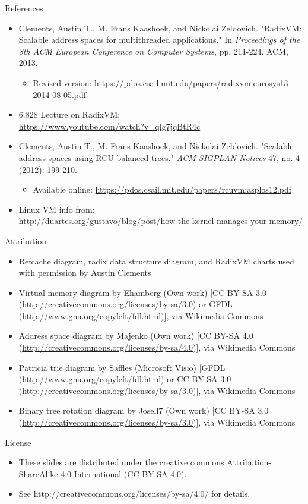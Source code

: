 \documentclass[aspectratio=169]{beamer}
\newcommand{\bi}{\begin{itemize}}
\newcommand{\ei}{\end{itemize}}
\begin{document}
\begin{frame}[noframenumbering]{References}
  \bi
\item Clements, Austin T., M. Frans Kaashoek, and Nickolai Zeldovich. "RadixVM: Scalable address spaces for multithreaded applications." In \emph{Proceedings of the 8th ACM European Conference on Computer Systems}, pp. 211-224. ACM, 2013.
  \bi
\item Revised version: \url{https://pdos.csail.mit.edu/papers/radixvm:eurosys13-2014-08-05.pdf}
  \ei
\item 6.828 Lecture on RadixVM:\\
  \url{https://www.youtube.com/watch?v=qlg7jqBtR4c}
\item Clements, Austin T., M. Frans Kaashoek, and Nickolai Zeldovich. "Scalable address spaces using RCU balanced trees." \emph{ACM SIGPLAN Notices} 47, no. 4 (2012): 199-210.
  \bi
\item Available online: \url{https://pdos.csail.mit.edu/papers/rcuvm:asplos12.pdf}
  \ei
\item Linux VM info from:\\ \url{http://duartes.org/gustavo/blog/post/how-the-kernel-manages-your-memory/}
  \ei
\end{frame}

\begin{frame}[noframenumbering]{Attribution}
  \bi
\item Refcache diagram, radix data structure diagram, and RadixVM charts used with permission by Austin Clements
\item Virtual memory diagram by Ehamberg (Own work) [CC BY-SA 3.0 (\url{http://creativecommons.org/licenses/by-sa/3.0}) or GFDL (\url{http://www.gnu.org/copyleft/fdl.html})], via Wikimedia Commons
\item Address space diagram by Majenko (Own work) [CC BY-SA 4.0 (\url{http://creativecommons.org/licenses/by-sa/4.0})], via Wikimedia Commons
\item Patricia trie diagram by Saffles (Microsoft Visio) [GFDL (\url{http://www.gnu.org/copyleft/fdl.html}) or CC BY-SA 3.0 (\url{http://creativecommons.org/licenses/by-sa/3.0})], via Wikimedia Commons
  \item Binary tree rotation diagram by Josell7 (Own work) [CC BY-SA 3.0 (\url{http://creativecommons.org/licenses/by-sa/3.0})], via Wikimedia Commons
  \ei
\end{frame}

\begin{frame}[noframenumbering]{License}
  \bi
\item These slides are distributed under the creative commons
  Attribution-ShareAlike 4.0 International (CC BY-SA 4.0).
\item See http://creativecommons.org/licenses/by-sa/4.0/ for details.
  \ei
\end{frame}
\end{document}
